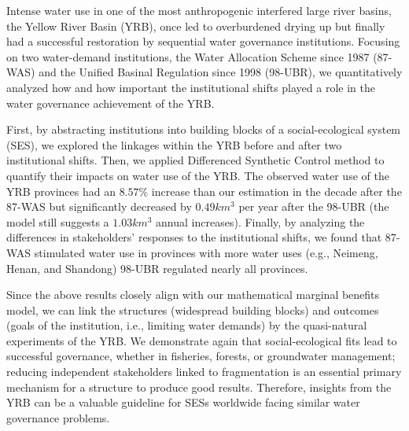 
Intense water use in one of the most anthropogenic interfered large river basins, the Yellow River Basin (YRB), once led to overburdened drying up but finally had a successful restoration by sequential water governance institutions.
Focusing on two water-demand institutions, the Water Allocation Scheme since 1987 (87-WAS) and the Unified Basinal Regulation since 1998 (98-UBR), we quantitatively analyzed how and how important the institutional shifts played a role in the water governance achievement of the YRB.

First, by abstracting institutions into building blocks of a social-ecological system (SES), we explored the linkages within the YRB before and after two institutional shifts.
Then, we applied Differenced Synthetic Control method to quantify their impacts on water use of the YRB.
The observed water use of the YRB provinces had an $8.57\%$ increase than our estimation in the decade after the 87-WAS but significantly decreased by $0.49 km^3$ per year after the 98-UBR (the model still suggests a $1.03 km^3$ annual increases).
Finally, by analyzing the differences in stakeholders' responses to the institutional shifts, we found that 87-WAS stimulated water use in provinces with more water uses (e.g., Neimeng, Henan, and Shandong) 98-UBR regulated nearly all provinces.

Since the above results closely align with our mathematical marginal benefits model, we can link the structures (widespread building blocks) and outcomes (goals of the institution, i.e., limiting water demands) by the quasi-natural experiments of the YRB.
We demonstrate again that social-ecological fits lead to successful governance, whether in fisheries, forests, or groundwater management; reducing independent stakeholders linked to fragmentation is an essential primary mechanism for a structure to produce good results.
Therefore, insights from the YRB can be a valuable guideline for SESs worldwide facing similar water governance problems.
